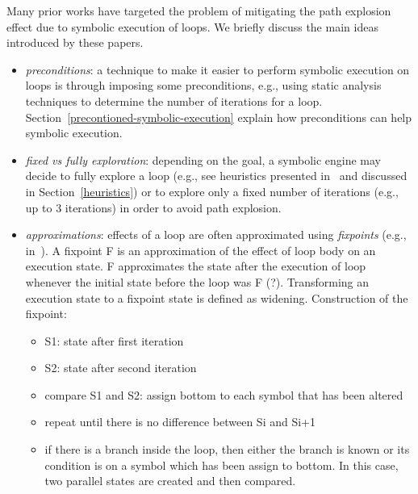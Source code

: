 Many prior works have targeted the problem of mitigating the path explosion effect due to symbolic execution of loops. We briefly discuss the main ideas introduced by these papers. 
\begin{itemize}

  \item {\em preconditions}: a technique to make it easier to perform symbolic execution on loops is through imposing some preconditions, e.g., using static analysis techniques to determine the number of iterations for a loop. Section~\ref{precontioned-symbolic-execution} explain how preconditions can help symbolic execution.

  \item {\em fixed vs fully exploration}: depending on the goal, a symbolic engine may decide to fully explore a loop (e.g., see heuristics presented in~\cite{AEG-NDSS11} and discussed in Section~\ref{heuristics}) or to explore only a fixed number of iterations (e.g., up to 3 iterations) in order to avoid path explosion.

  \item {\em approximations}: effects of a loop are often approximated using {\em fixpoints} (e.g., in~\cite{KKM-USEC05,BNS-SP06,CFB-ACSAC06}). A fixpoint F is an approximation of the effect of loop body on an execution state. F approximates the state after the execution of loop whenever the initial state before the loop was F (?). Transforming an execution state to a fixpoint state is defined as widening. Construction of the fixpoint:
  \begin{itemize}
    \item S1: state after first iteration
    \item S2: state after second iteration
    \item compare S1 and S2: assign bottom to each symbol that has been altered
    \item repeat until there is no difference between Si and Si+1
    \item if there is a branch inside the loop, then either the branch is known or its condition is on a symbol which has been assign to bottom. In this case, two parallel states are created and then compared.
  \end{itemize}


\end{itemize}
